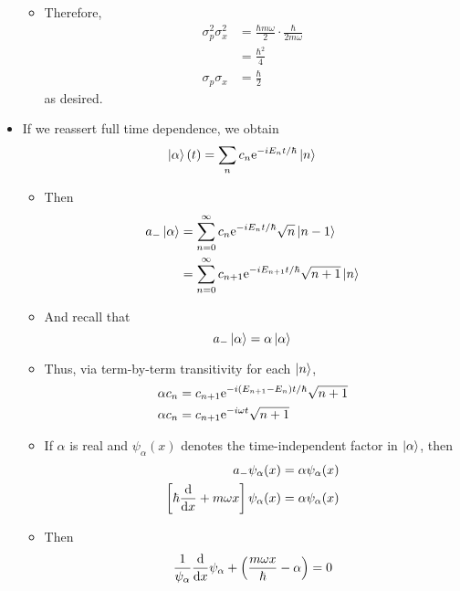 \documentclass[../notes.tex]{subfiles}
\begin{document}
\begin{itemize}
\begin{itemize}
        \item Therefore,
        \begin{align*}
            \sigma_p^2\sigma_x^2 &= \frac{\hbar m\omega}{2}\cdot\frac{\hbar}{2m\omega}\\
            &= \frac{\hbar^2}{4}\\
            \sigma_p\sigma_x &= \frac{\hbar}{2}
        \end{align*}
        as desired.
    \end{itemize}
    \item If we reassert full time dependence, we obtain
    \begin{equation*}
        \ket{\alpha}(t) = \sum_nc_n\e[-iE_nt/\hbar]\ket{n}
    \end{equation*}
    \begin{itemize}
        \item Then
        \begin{align*}
            a_-\ket{\alpha} &= \sum_{n=0}^\infty c_n\e[-iE_nt/\hbar]\sqrt{n}\ket{n-1}\\
            &= \sum_{n=0}^\infty c_{n+1}\e[-iE_{n+1}t/\hbar]\sqrt{n+1}\ket{n}
        \end{align*}
        \item And recall that
        \begin{equation*}
            a_-\ket{\alpha} = \alpha\ket{\alpha}
        \end{equation*}
        \item Thus, via term-by-term transitivity for each $\ket{n}$,
        \begin{align*}
            \alpha c_n &= c_{n+1}\e[-i(E_{n+1}-E_n)t/\hbar]\sqrt{n+1}\\
            \alpha c_n &= c_{n+1}\e[-i\omega t]\sqrt{n+1}
        \end{align*}
        \item If $\alpha$ is real and $\psi_\alpha(x)$ denotes the time-independent factor in $\ket{\alpha}$, then
        \begin{align*}
            a_-\psi_\alpha(x) &= \alpha\psi_\alpha(x)\\
            \left[ \hbar\dv{x}+m\omega x \right]\psi_\alpha(x) &= \alpha\psi_\alpha(x)
        \end{align*}
        \item Then
        \begin{equation*}
            \frac{1}{\psi_\alpha}\dv{x}\psi_\alpha+\left( \frac{m\omega x}{\hbar}-\alpha \right) = 0
        \end{equation*}

\end{itemize}
\end{itemize}
\end{document}
